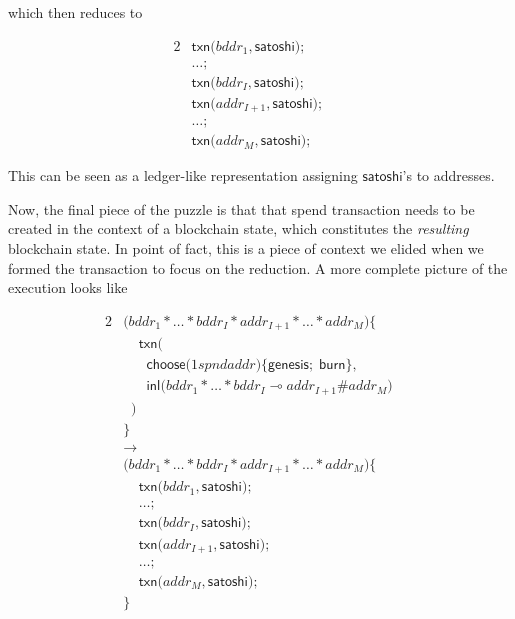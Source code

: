 \documentclass[]{acm_proc_article-sp}
\numberwithin{equation}{subsection}
\begin{document}
which then reduces to

\begin{alignat*}{2}
  &\mathsf{txn}\mathsf{(} bddr_1, \mathsf{satoshi} \mathsf{)} \mathsf{;} && \\
  &\ldots \mathsf{;} && \\
  &\mathsf{txn}\mathsf{(} bddr_I, \mathsf{satoshi} \mathsf{)} \mathsf{;} && \\
  &\mathsf{txn}\mathsf{(} addr_{I+1}, \mathsf{satoshi} \mathsf{)} \mathsf{;} && \\
  &\ldots \mathsf{;} && \\
  &\mathsf{txn}\mathsf{(} addr_M, \mathsf{satoshi} \mathsf{)} \mathsf{;} &&
\end{alignat*} 

This can be seen as a ledger-like representation assigning
$\mathsf{satoshi}$'s to addresses.

Now, the final piece of the puzzle is that that spend transaction
needs to be created in the context of a blockchain state, which
constitutes the \emph{resulting} blockchain state. In point of fact,
this is a piece of context we elided when we formed the transaction to
focus on the reduction. A more complete picture of the execution looks like

\begin{alignat*}{2}
  &\mathsf{(} bddr_1 * \ldots * bddr_I * addr_{I+1} * \ldots * addr_M  \mathsf{)} \mathsf{\{} && \\
  &\;\;\;\;\mathsf{txn}\mathsf{(} && \\
  &\;\;\;\;\;\;\mathsf{choose}\mathsf{(} 1spndaddr \mathsf{)}\mathsf{\{} \mathsf{genesis}\mathsf{;}\; \mathsf{burn} \mathsf{\}}, && \\
  &\;\;\;\;\;\;\mathsf{inl}\mathsf{(} bddr_1 * \ldots * bddr_I \multimap addr_{I+1} \# addr_M \mathsf{)} && \\
  &\;\;\mathsf{)} && \\
  &\mathsf{\}} && \\
  &\rightarrow && \\
  &\mathsf{(} bddr_1 * \ldots * bddr_I * addr_{I+1} * \ldots * addr_M  \mathsf{)} \mathsf{\{} && \\
  &\;\;\;\;\mathsf{txn}\mathsf{(} bddr_1, \mathsf{satoshi} \mathsf{)} \mathsf{;}&& \\
  &\;\;\;\;\ldots \mathsf{;} && \\
  &\;\;\;\;\mathsf{txn}\mathsf{(} bddr_I, \mathsf{satoshi} \mathsf{)} \mathsf{;} && \\
  &\;\;\;\;\mathsf{txn}\mathsf{(} addr_{I+1}, \mathsf{satoshi} \mathsf{)} \mathsf{;} && \\
  &\;\;\;\;\ldots \mathsf{;} && \\
  &\;\;\;\;\mathsf{txn}\mathsf{(} addr_M, \mathsf{satoshi} \mathsf{)} \mathsf{;} && \\
  &\mathsf{\}} &&
\end{alignat*}
\end{document}
